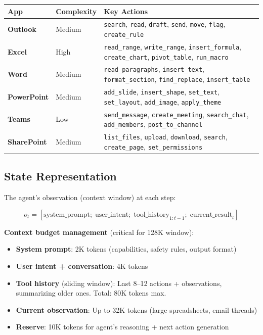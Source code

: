\begin{tabular}{@{}lp{5cm}p{8cm}@{}}
\toprule
\textbf{App} & \textbf{Complexity} & \textbf{Key Actions} \\
\midrule
\textbf{Outlook} & Medium & \texttt{search}, \texttt{read}, \texttt{draft}, \texttt{send}, \texttt{move}, \texttt{flag}, \texttt{create\_rule} \\
\textbf{Excel} & High & \texttt{read\_range}, \texttt{write\_range}, \texttt{insert\_formula}, \texttt{create\_chart}, \texttt{pivot\_table}, \texttt{run\_macro} \\
\textbf{Word} & Medium & \texttt{read\_paragraphs}, \texttt{insert\_text}, \texttt{format\_section}, \texttt{find\_replace}, \texttt{insert\_table} \\
\textbf{PowerPoint} & Medium & \texttt{add\_slide}, \texttt{insert\_shape}, \texttt{set\_text}, \texttt{set\_layout}, \texttt{add\_image}, \texttt{apply\_theme} \\
\textbf{Teams} & Low & \texttt{send\_message}, \texttt{create\_meeting}, \texttt{search\_chat}, \texttt{add\_members}, \texttt{post\_to\_channel} \\
\textbf{SharePoint} & Medium & \texttt{list\_files}, \texttt{upload}, \texttt{download}, \texttt{search}, \texttt{create\_page}, \texttt{set\_permissions} \\
\bottomrule
\end{tabular}

\subsection{State Representation}
\label{state-representation}

The agent’s observation (context window) at each step:

\begin{equation}
o_t = [\text{system\_prompt};\; \text{user\_intent};\; \text{tool\_history}_{1:t-1};\; \text{current\_result}_t]
\end{equation}

\textbf{Context budget management} (critical for 128K window):

\begin{itemize}
  \item \textbf{System prompt}: 2K tokens (capabilities, safety rules, output format)
  \item \textbf{User intent + conversation}: 4K tokens
  \item \textbf{Tool history} (sliding window): Last 8--12 actions + observations, summarizing older ones. Total: 80K tokens max.
  \item \textbf{Current observation}: Up to 32K tokens (large spreadsheets, email threads)
  \item \textbf{Reserve}: 10K tokens for agent’s reasoning + next action generation
\end{itemize}

